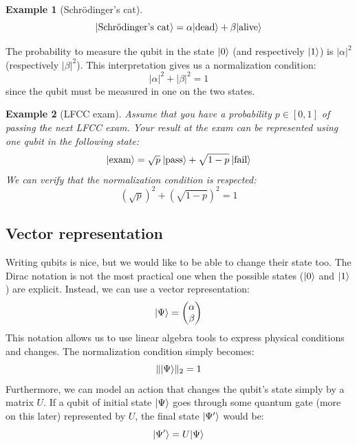 \documentclass[12pt,a4paper]{article}
\theoremstyle{plain}
\newtheorem*{example}{Example}
\theoremstyle{definition}
\DeclarePairedDelimiter\ket{\lvert}{\rangle}
\begin{document}
\begin{example}[Schrödinger's cat]
    \begin{equation*}
        \ket{\textnormal{Schrödinger's cat}} = \alpha\ket{\textnormal{dead}} + \beta\ket{\textnormal{alive}}
    \end{equation*}
\end{example}

The probability to measure the qubit in the state $\ket{0}$ (and respectively $\ket{1}$) is $|\alpha|^2$ (respectively $|\beta|^2$). This interpretation gives us a normalization condition:
\begin{equation*}
    |\alpha|^2+|\beta|^2=1
\end{equation*}
since the qubit must be measured in one on the two states.

\begin{example}[LFCC exam]
    Assume that you have a probability $p\in[0, 1]$ of passing the next LFCC exam. Your result at the exam can be represented using one qubit in the following state:
    \begin{equation*}
        \ket{\textnormal{exam}} = \sqrt{p} \: \ket{\textnormal{pass}}+\sqrt{1-p} \: \ket{\textnormal{fail}}
    \end{equation*}
    We can verify that the normalization condition is respected:
    \begin{equation*}
        (\sqrt{p})^2 + (\sqrt{1-p})^2 = 1
    \end{equation*}
\end{example}

\subsection{Vector representation}
Writing qubits is nice, but we would like to be able to change their state too. The Dirac notation is not the most practical one when the possible states ($\ket{0}$ and $\ket{1}$) are explicit. Instead, we can use a vector representation:
\begin{equation*}
    \ket{\Psi} = \begin{pmatrix}\alpha\\\beta\end{pmatrix}
\end{equation*}
This notation allows us to use linear algebra tools to express physical conditions and changes. The normalization condition simply becomes:
\begin{equation*}
    \|\ket{\Psi}\|_2 = 1
\end{equation*}
Furthermore, we can model an action that changes the qubit's state simply by a matrix $U$. If a qubit of initial state $\ket{\Psi}$ goes through some quantum gate (more on this later) represented by $U$, the final state $\ket{\Psi'}$ would be:
\begin{equation*}
    \ket{\Psi'} = U\ket{\Psi}
\end{equation*}
\end{document}
